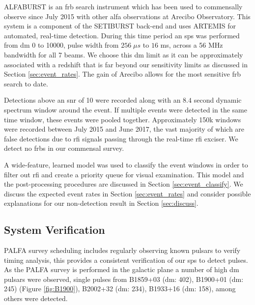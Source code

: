 \documentclass[a4paper,fleqn,usenatbib]{mnras}
\begin{document}
ALFABURST is an \gls{frb} search instrument which has been used to commensally
observe since July 2015 with other \gls{alfa} observations at Arecibo
Observatory. This system is a component of the SETIBURST back-end
\citep{2017ApJS..228...21C} and uses ARTEMIS \citep{2015MNRAS.452.1254K} for
automated, real-time detection. During this time period an \gls{sps} was
performed from \gls{dm} 0 to 10000, pulse width from $256 \; \mu s$ to $16$ ms,
across a 56 MHz bandwidth for all 7 beams. We choose this \gls{dm} limit as it
can be approximately associated with a redshift that is far beyond our
sensitivity limits as discussed in Section \ref{sec:event_rates}. The gain of
Arecibo allows for the most sensitive \gls{frb} search to date.

Detections above an \gls{snr} of 10 were recorded along with an $8.4$ second
dynamic spectrum window around the event. If multiple events were detected in
the same time window, these events were pooled together.  Approximately 150k
windows were recorded between July 2015 and June 2017, the vast majority of
which are false detections due to \gls{rfi} signals passing through the
real-time \gls{rfi} exciser. We detect no \glspl{frb} in our commensal survey.

A wide-feature, learned model was used to classify the event windows in order to
filter out \gls{rfi} and create a priority queue for visual examination. This
model and the post-processing procedures are discussed in Section
\ref{sec:event_classify}. We discuss the expected event rates in Section
\ref{sec:event_rates} and consider possible explanations for our non-detection
result in Section \ref{sec:discuss}.


\subsection{System Verification}
\label{sec:system_verify}

PALFA survey scheduling includes regularly observing known pulsars to verify
timing analysis, this provides a consistent verification of our \gls*{sps} to
detect pulses. As the PALFA survey is performed in the galactic plane a number
of high \gls*{dm} pulsars were observed, single pulses from B1859+03 (\gls*{dm}:
402), B1900+01 (\gls*{dm}: 245) (Figure \ref{fig:B1900}), B2002+32 (\gls*{dm}:
234), B1933+16 (\gls*{dm}: 158), among others were detected.
\end{document}
